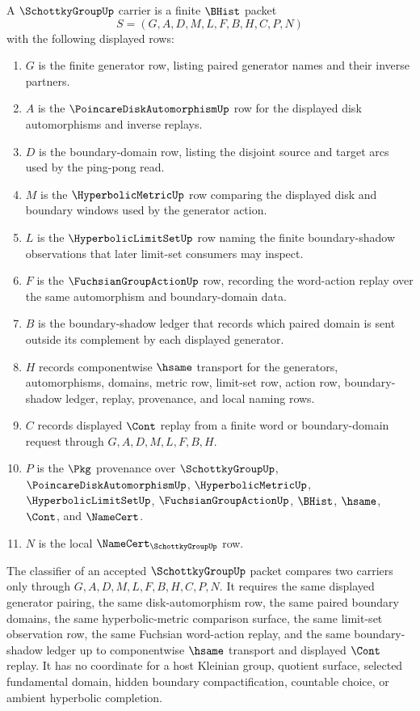 \begin{definition}\label{def:schottky-group-carrier}
A $\SchottkyGroupUp$ carrier is a finite $\BHist$ packet
$$
S=(G,A,D,M,L,F,B,H,C,P,N)
$$
with the following displayed rows:
\begin{enumerate}
\item $G$ is the finite generator row, listing paired generator names and their inverse partners.
\item $A$ is the $\PoincareDiskAutomorphismUp$ row for the displayed disk automorphisms and inverse replays.
\item $D$ is the boundary-domain row, listing the disjoint source and target arcs used by the ping-pong read.
\item $M$ is the $\HyperbolicMetricUp$ row comparing the displayed disk and boundary windows used by the generator action.
\item $L$ is the $\HyperbolicLimitSetUp$ row naming the finite boundary-shadow observations that later limit-set consumers may inspect.
\item $F$ is the $\FuchsianGroupActionUp$ row, recording the word-action replay over the same automorphism and boundary-domain data.
\item $B$ is the boundary-shadow ledger that records which paired domain is sent outside its complement by each displayed generator.
\item $H$ records componentwise $\hsame$ transport for the generators, automorphisms, domains, metric row, limit-set row, action row, boundary-shadow ledger, replay, provenance, and local naming rows.
\item $C$ records displayed $\Cont$ replay from a finite word or boundary-domain request through $G,A,D,M,L,F,B,H$.
\item $P$ is the $\Pkg$ provenance over $\SchottkyGroupUp$, $\PoincareDiskAutomorphismUp$, $\HyperbolicMetricUp$, $\HyperbolicLimitSetUp$, $\FuchsianGroupActionUp$, $\BHist$, $\hsame$, $\Cont$, and $\NameCert$.
\item $N$ is the local $\NameCert_{\SchottkyGroupUp}$ row.
\end{enumerate}
\end{definition}

\begin{definition}\label{def:schottky-group-classifier}
The classifier of an accepted $\SchottkyGroupUp$ packet compares two carriers only through $G,A,D,M,L,F,B,H,C,P,N$. It requires the same displayed generator pairing, the same disk-automorphism row, the same paired boundary domains, the same hyperbolic-metric comparison surface, the same limit-set observation row, the same Fuchsian word-action replay, and the same boundary-shadow ledger up to componentwise $\hsame$ transport and displayed $\Cont$ replay. It has no coordinate for a host Kleinian group, quotient surface, selected fundamental domain, hidden boundary compactification, countable choice, or ambient hyperbolic completion.
\end{definition}

